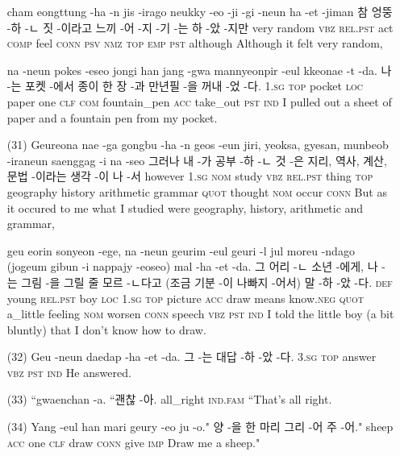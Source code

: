 \begin{itemize}
\tgl
		{cham eongttung -ha -n jis -irago neukky -eo -ji -gi -neun ha -et -jiman}
		{참 엉뚱 -하 -ㄴ 짓 -이라고 느끼 -어 -지 -기 -는 하 -았 -지만}
		{very	random	\textsc{vbz}	\textsc{rel.pst}	act	\textsc{comp}	feel	\textsc{conn}	\textsc{psv}	\textsc{nmz}	\textsc{top}	\textsc{emp}	\textsc{pst}	although}
		{Although it felt very random,}

\tgl
{na -neun pokes -eseo jongi han jang -gwa mannyeonpir -eul kkeonae -t -da.}
		{나 -는 포켓 -에서 종이 한 장 -과 만년필 -을 꺼내 -었 -다.}
		{\textsc{1.sg}	\textsc{top}	pocket	\textsc{loc}	paper	one	\textsc{clf}	\textsc{com}	fountain\_pen	\textsc{acc}	take\_out	\textsc{pst}	\textsc{ind}}
		{I pulled out a sheet of paper and a fountain pen from my pocket.}
		
\item [(31)]
\tgl
		{Geureona nae -ga gongbu -ha -n geos -eun jiri, yeoksa, gyesan, munbeob -iraneun saenggag -i na -seo}
		{그러나 내 -가 공부 -하 -ㄴ 것 -은 지리, 역사, 계산, 문법 -이라는 생각 -이 나 -서}
		{however	\textsc{1.sg}	\textsc{nom}	study	\textsc{vbz}	\textsc{rel.pst}	thing	\textsc{top}	geography	history	arithmetic	grammar	\textsc{quot}	thought	\textsc{nom}	occur	\textsc{conn}}
		{But as it occured to me what I studied were geography, history, arithmetic and grammar,}

\tgl
		{geu eorin sonyeon -ege, na -neun geurim -eul geuri -l jul moreu -ndago (jogeum gibun -i nappajy -eoseo) mal -ha -et -da.}
		{그 어리 -ㄴ 소년 -에게, 나 -는 그림 -을 그릴 줄 모르 -ㄴ다고 (조금 기분 -이 나빠지 -어서) 말 -하 -았 -다.}
		{\textsc{def}	young	\textsc{rel.pst}	boy	\textsc{loc}	\textsc{1.sg}	\textsc{top}	picture	\textsc{acc}	draw	means	know.\textsc{neg}	\textsc{quot}	a\_little	feeling	\textsc{nom}	worsen	\textsc{conn}	speech	\textsc{vbz}	\textsc{pst}	\textsc{ind}}
		{I told the little boy (a bit bluntly) that I don't know how to draw.}
		
\item [(32)]
\tgl
		{Geu -neun daedap -ha -et -da.}
		{그 -는 대답 -하 -았 -다.}
		{\textsc{3.sg}	\textsc{top}	answer	\textsc{vbz}	\textsc{pst}	\textsc{ind}}
		{He answered.}

\item [(33)]
\tgl
		{``gwaenchan -a.}
		{``괜찮 -아.}
		{all\_right	\textsc{ind.fam}}
		{``That's all right.}

\item [(34)]
\tgl
		{Yang -eul han mari geury -eo ju -o."}
		{양 -을 한 마리 그리 -어 주 -어."}
		{sheep	\textsc{acc}	one	\textsc{clf}	draw	\textsc{conn}	give	\textsc{imp}}
		{Draw me a sheep."}
		

\end{itemize}
